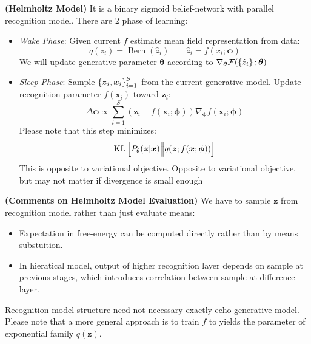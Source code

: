 \begin{definition}{\textbf{(Helmholtz Model)}}
    It is a binary sigmoid belief-network with parallel recognition model. There are $2$ phase of learning:
    \begin{itemize}
        \item \emph{Wake Phase}: Given current $f$ estimate mean field representation from data: 
        \begin{equation*}
            q(z_i) = \operatorname{Bern}(\hat{z}_i)\qquad \hat{z}_i = f(x_i;\boldsymbol \phi)
        \end{equation*}
        We will update generative parameter $\boldsymbol \theta$ according to $\nabla_{\boldsymbol \theta} \mathcal{F}(\left\{ \hat{z}_i \right\};\boldsymbol \theta)$
        \item \emph{Sleep Phase}: Sample $\left\{ \boldsymbol z_i, \boldsymbol x_i \right\}^S_{i=1}$ from the current generative model. Update recognition parameter $f(\boldsymbol x_i)$ toward $\boldsymbol z_i$:
        \begin{equation*}
            \Delta \boldsymbol \phi \propto \sum^S_{i=1} (\boldsymbol z_i - f(\boldsymbol x_i;\boldsymbol \phi))\nabla_{\boldsymbol \phi}f(\boldsymbol x_i;\boldsymbol \phi)
        \end{equation*}
        Please note that this step minimizes:
        \begin{equation*}
            \operatorname{KL}\left[ P_\theta(\boldsymbol z|\boldsymbol x) \Big\| q(\boldsymbol z; f(\boldsymbol x;\boldsymbol \phi))  \right]
        \end{equation*}
        This is opposite to variational objective. Opposite to variational objective, but may not matter if divergence is small enough
    \end{itemize}
\end{definition}

\begin{remark}{\textbf{(Comments on Helmholtz Model Evaluation)}}
    We have to sample $\boldsymbol z$ from recognition model rather than just evaluate means: 
    \begin{itemize}
        \item Expectation in free-energy can be computed directly rather than by means substuition. 
        \item In hieratical model, output of higher recognition layer depends on sample at previous stages, which introduces correlation between sample at difference layer. 
    \end{itemize}
    Recognition model structure need not necessary exactly echo generative model. Please note that a more general approach is to train $f$ to yields the parameter of exponential family $q(\boldsymbol z)$. 
\end{remark}

